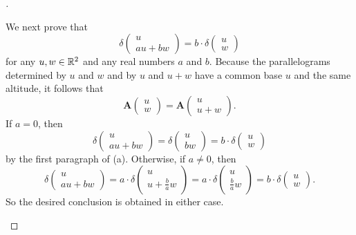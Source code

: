 \begin{proof}[]
\begin{enumerate}
          We next prove that
          \[
            \delta\begin{pmatrix}
              u \\
              au + bw
            \end{pmatrix} = b \cdot \delta\begin{pmatrix}
              u \\
              w
            \end{pmatrix}
          \]
          for any \(u, w \in \mathbb{R}^2\) and any real numbers \(a\) and \(b\).
          Because the parallelograms determined by \(u\) and \(w\) and by \(u\) and \(u + w\) have a common base \(u\) and the same altitude, it follows that
          \[
            \mathbf{A}\begin{pmatrix}
              u \\
              w
            \end{pmatrix} = \mathbf{A}\begin{pmatrix}
              u \\
              u + w
            \end{pmatrix}.
          \]
          If \(a = 0\), then
          \[
            \delta\begin{pmatrix}
              u \\
              au + bw
            \end{pmatrix} = \delta\begin{pmatrix}
              u \\
              bw
            \end{pmatrix} = b \cdot \delta\begin{pmatrix}
              u \\
              w
            \end{pmatrix}
          \]
          by the first paragraph of (a).
          Otherwise, if \(a \neq 0\), then
          \[
            \delta\begin{pmatrix}
              u \\
              au + bw
            \end{pmatrix} = a \cdot \delta\begin{pmatrix}
              u \\
              u + \frac{b}{a} w
            \end{pmatrix} = a \cdot \delta\begin{pmatrix}
              u \\
              \frac{b}{a} w
            \end{pmatrix} = b \cdot \delta\begin{pmatrix}
              u \\
              w
            \end{pmatrix}.
          \]
          So the desired conclusion is obtained in either case.


\end{enumerate}
\end{proof}
